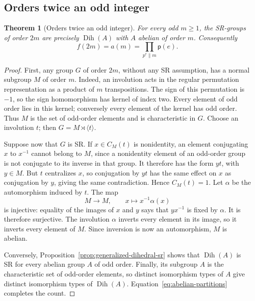 \documentclass[11pt,a4paper]{amsart}
\newtheorem{thm}{Theorem}[section]
\theoremstyle{definition}
\theoremstyle{remark}
\numberwithin{equation}{section}
\begin{document}
\subsection{Orders twice an odd integer}
\begin{thm}[Orders twice an odd integer]\label{thm:twice-odd}
For every odd $m\ge1$, the SR-groups of order $2m$ are precisely
$\operatorname{Dih}(A)$ with $A$ abelian of order $m$. Consequently
\begin{equation}\label{eq:twice-odd-count}
 \boxed{f(2m)=a(m)=\prod_{p^e\parallel m}\mathsf p(e).}
\end{equation}
\end{thm}
\begin{proof}
First, any group $G$ of order $2m$, without any SR assumption, has a
normal subgroup $M$ of order $m$. Indeed, an involution acts in the
regular permutation representation as a product of $m$ transpositions.
The sign of this permutation is $-1$, so the sign homomorphism has
kernel of index two. Every element of odd order lies in this kernel;
conversely every element of the kernel has odd order. Thus $M$ is the
set of odd-order elements and is characteristic in $G$.
Choose an involution $t$; then $G=M\rtimes\langle t\rangle$.

Suppose now that $G$ is SR. If $x\in C_M(t)$ is nonidentity, an element
conjugating $x$ to $x^{-1}$ cannot belong to $M$, since a nonidentity
element of an odd-order group is not conjugate to its inverse in that
group. It therefore has the form $yt$, with $y\in M$. But $t$ centralizes
$x$, so conjugation by $yt$ has the same effect on $x$ as conjugation
by $y$, giving the same contradiction. Hence $C_M(t)=1$.
Let $\alpha$ be the automorphism induced by $t$. The map
\[
 M\longrightarrow M,\qquad x\longmapsto x^{-1}\alpha(x)
\]
is injective: equality of the images of $x$ and $y$ says that
$yx^{-1}$ is fixed by $\alpha$. It is therefore surjective.
The involution $\alpha$ inverts every element in its image, so it
inverts every element of $M$. Since inversion is now an automorphism,
$M$ is abelian.

Conversely, Proposition~\ref{prop:generalized-dihedral-sr} shows that
$\operatorname{Dih}(A)$ is SR for every abelian group $A$ of odd order.
Finally, its subgroup $A$ is the
characteristic set of odd-order elements, so distinct isomorphism types
of $A$ give distinct isomorphism types of $\operatorname{Dih}(A)$.
Equation~\eqref{eq:abelian-partitions} completes the count.
\end{proof}
\end{document}
